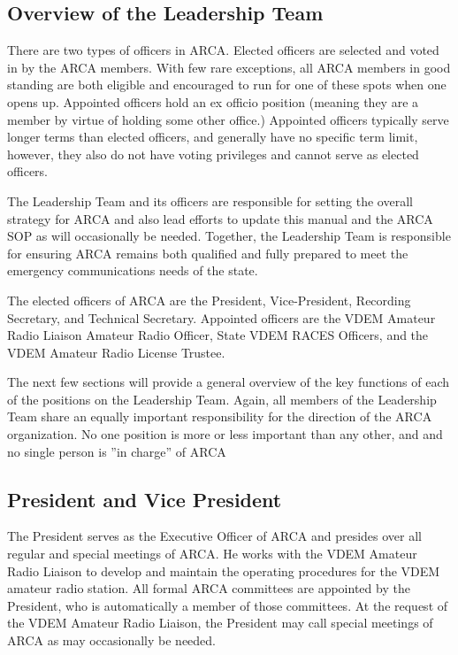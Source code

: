 \documentclass[pdflatex,letterpaper,twoside,12pt]{book}
\begin{document}
\subsection{Overview of the Leadership Team}

There are two types of officers in ARCA.  Elected officers are selected and voted in by the ARCA members.  With few rare exceptions, all ARCA members in good standing are both eligible and encouraged to run for one of these spots when one opens up.  Appointed officers hold an ex officio position (meaning they are a member by virtue of holding some other office.)  Appointed officers typically serve longer terms than elected officers, and generally have no specific term limit, however, they also do not have voting privileges and cannot serve as elected officers.

The Leadership Team and its officers are responsible for setting the overall strategy for ARCA and also lead efforts to update this manual and the ARCA SOP as will occasionally be needed.  Together, the Leadership Team is responsible for ensuring ARCA remains both qualified and fully prepared to meet the emergency communications needs of the state.

The elected officers of ARCA are the President, Vice-President, Recording Secretary, and Technical Secretary.  Appointed officers are the VDEM Amateur Radio Liaison Amateur Radio Officer, State VDEM RACES Officers, and the VDEM Amateur Radio License Trustee.

The next few sections will provide a general overview of the key functions of each of the positions on the Leadership Team.  Again, all members of the Leadership Team share an equally important responsibility for the direction of the ARCA organization.  No one position is more or less important than any other, and and no single person is ''in charge'' of ARCA

\subsection{President and Vice President}

The President serves as the Executive Officer of ARCA and presides over all regular and special meetings of ARCA.  He works with the VDEM Amateur Radio Liaison to develop and maintain the operating procedures for the VDEM amateur radio station.  All formal ARCA committees are appointed by the President, who is automatically a member of those committees.  At the request of the VDEM Amateur Radio Liaison, the President may call special meetings of ARCA as may occasionally be needed.
\end{document}
